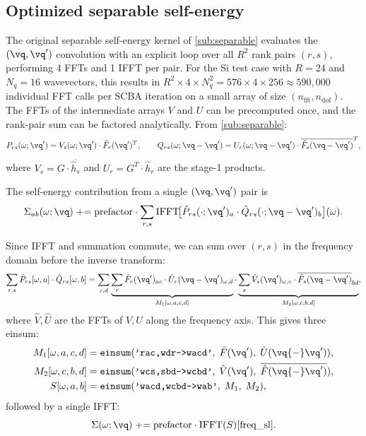 \subsection{Optimized separable self-energy}
\label{sub:separable_optimized}

The original separable self-energy kernel of \cref{sub:separable}
evaluates the $(\vq, \vq')$ convolution with an explicit loop over all
$R^2$ rank pairs $(r, s)$, performing 4 FFTs and 1 IFFT per pair.  For
the Si test case with $R = 24$ and $N_q = 16$ wavevectors, this results
in $R^2 \times 4 \times N_q^2 = 576 \times 4 \times 256 \approx
590{,}000$ individual FFT calls per SCBA iteration on a small
array of size $(n_\mathrm{fft}, n_\mathrm{dof})$.  The FFTs of the
intermediate arrays $V$ and $U$ can be precomputed once, and the
rank-pair sum can be factored analytically.  From \cref{sub:separable}:
\begin{equation}
  P_{rs}(\omega; \vq')
  = V_s(\omega; \vq') \cdot \hat{F}_r(\vq')^T,
  \qquad
  Q_{rs}(\omega; \vq - \vq')
  = U_r(\omega; \vq - \vq') \cdot \overline{\hat{F}_s(\vq - \vq')}^T,
\end{equation}
where $V_s = G \cdot \overline{\hat{h}_s}$ and $U_r = G^T \cdot
\hat{h}_r$ are the stage-1 products.

The self-energy contribution from a single $(\vq, \vq')$ pair is
\begin{equation}
  \Sigma_{ab}(\omega; \vq)
  \mathrel{+}=
  \mathrm{prefactor} \cdot
  \sum_{r,s}
  \mathrm{IFFT}\!\bigl[
    \hat{P}_{rs}(\cdot; \vq')_a \cdot
    \hat{Q}_{rs}(\cdot; \vq - \vq')_b
  \bigr](\omega).
\end{equation}

Since IFFT and summation commute, we can sum over $(r,s)$ in the
frequency domain before the inverse transform:
\begin{equation}
  \sum_{r,s} \hat{P}_{rs}[\omega, a] \cdot \hat{Q}_{rs}[\omega, b]
  = \sum_{c,d}
    \underbrace{
      \sum_r \hat{F}_r(\vq')_{ac} \cdot \hat{U}_r(\vq-\vq')_{\omega,d}
    }_{M_1[\omega,a,c,d]}
    \cdot
    \underbrace{
      \sum_s \hat{V}_s(\vq')_{\omega,c} \cdot
      \overline{\hat{F}_s(\vq-\vq')}_{bd}
    }_{M_2[\omega,c,b,d]},
\end{equation}
where $\hat{V}, \hat{U}$ are the FFTs of $V, U$ along the frequency
axis.  This gives three einsum:
\begin{align}
  M_1[\omega,a,c,d]
  &= \texttt{einsum}(\texttt{'rac,wdr->wacd'},\;
     \hat{F}(\vq'),\; \hat{U}(\vq{-}\vq')),
  \label{eq:M1} \\
  M_2[\omega,c,b,d]
  &= \texttt{einsum}(\texttt{'wcs,sbd->wcbd'},\;
     \hat{V}(\vq'),\; \overline{\hat{F}(\vq{-}\vq')}),
  \label{eq:M2} \\
  S[\omega,a,b]
  &= \texttt{einsum}(\texttt{'wacd,wcbd->wab'},\; M_1,\; M_2),
  \label{eq:S_contract}
\end{align}
followed by a single IFFT:
\begin{equation}
  \Sigma(\omega; \vq) \mathrel{+}=
  \mathrm{prefactor} \cdot \mathrm{IFFT}(S)[\mathrm{freq\_sl}].
\end{equation}

